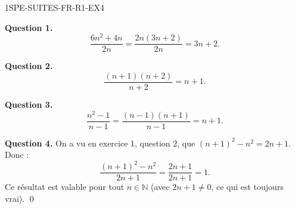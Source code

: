 \begin{corrige}{1SPE-SUITES-FR-R1-EX4}


\textbf{Question 1.}
\[
\frac{6n^2 + 4n}{2n} = \frac{2n(3n+2)}{2n} = 3n + 2.
\]


\textbf{Question 2.}
\[
\frac{(n+1)(n+2)}{n+2} = n+1.
\]


\textbf{Question 3.}
\[
\frac{n^2-1}{n-1} = \frac{(n-1)(n+1)}{n-1} = n+1.
\]


\textbf{Question 4.} On a vu en exercice 1, question 2, que $(n+1)^2 - n^2 = 2n+1$. Donc :
\[
\frac{(n+1)^2 - n^2}{2n+1} = \frac{2n+1}{2n+1} = 1.
\]
Ce résultat est valable pour tout $n \in \mathbb{N}$ (avec $2n+1 \neq 0$, ce qui est toujours vrai). \qed

\end{corrige}
